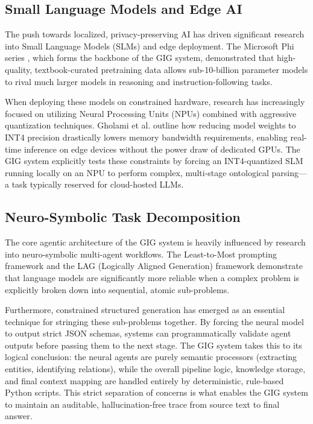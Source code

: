 \subsection{Small Language Models and Edge AI}
The push towards localized, privacy-preserving AI has driven significant research into Small Language Models (SLMs) and edge deployment. The Microsoft Phi series \citep{gunasekar2023textbooks}, which forms the backbone of the GIG system, demonstrated that high-quality, textbook-curated pretraining data allows sub-10-billion parameter models to rival much larger models in reasoning and instruction-following tasks.

When deploying these models on constrained hardware, research has increasingly focused on utilizing Neural Processing Units (NPUs) combined with aggressive quantization techniques. Gholami et al. \citep{gholami2021survey} outline how reducing model weights to INT4 precision drastically lowers memory bandwidth requirements, enabling real-time inference on edge devices without the power draw of dedicated GPUs. The GIG system explicitly tests these constraints by forcing an INT4-quantized SLM running locally on an NPU to perform complex, multi-stage ontological parsing—a task typically reserved for cloud-hosted LLMs.

\subsection{Neuro-Symbolic Task Decomposition}
The core agentic architecture of the GIG system is heavily influenced by research into neuro-symbolic multi-agent workflows. The Least-to-Most prompting framework \citep{zhou2022least} and the LAG (Logically Aligned Generation) framework demonstrate that language models are significantly more reliable when a complex problem is explicitly broken down into sequential, atomic sub-problems. 

Furthermore, constrained structured generation \citep{willard2023efficient} has emerged as an essential technique for stringing these sub-problems together. By forcing the neural model to output strict JSON schemas, systems can programmatically validate agent outputs before passing them to the next stage. The GIG system takes this to its logical conclusion: the neural agents are purely semantic processors (extracting entities, identifying relations), while the overall pipeline logic, knowledge storage, and final context mapping are handled entirely by deterministic, rule-based Python scripts. This strict separation of concerns is what enables the GIG system to maintain an auditable, hallucination-free trace from source text to final answer.
